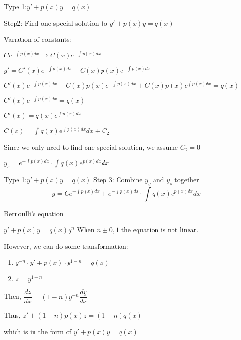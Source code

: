 \begin{frame}{Type 1:$y' + p(x) y = q(x)$}

    Step2: Find one special solution to $y' + p(x) y = q(x)$

    \centering
    Variation of constants:

    $Ce^{-\int p(x)dx} \rightarrow C(x)e^{-\int p(x)dx}$

    $y' = C'(x)e^{-\int p(x)dx} - C(x)p(x) e^{-\int p(x)dx}$

    $C'(x)e^{-\int p(x)dx} - C(x)p(x) e^{-\int p(x)dx} + C(x)p(x)e^{\int p(x)dx} = q(x)$

    $C'(x)e^{-\int p(x)dx} = q(x)$

    $C'(x) = q(x)e^{\int p(x)dx}$

    $C(x) = \int q(x)e^{\int p(x)dx} dx + C_2$

    Since we only need to find one special solution, we assume $C_2 = 0$

    $y_s = e^{-\int p(x)dx}\cdot \int q(x)e^{p(x)dx} dx$
\end{frame}







\begin{frame}{Type 1:$y' + p(x) y = q(x)$}
    Step 3: Combine $y_g$ and $y_s$ together
    \begin{equation*}
        y = Ce^{-\int p(x)dx} + e^{-\int p(x)dx}\cdot \int q(x)e^{p(x)dx} dx
    \end{equation*}
\end{frame}





\begin{frame}{Bernoulli's equation}
    \begin{block}{$y' + p(x)y = q(x) y^n$}
        When $n\pm 0, 1$ the equation is not linear.

        However, we can do some transformation:
        \begin{enumerate}
            \item $y^{-n}\cdot y' + p(x) \cdot y^{1-n} = q(x)$
            \item $z = y^{1-n}$
        \end{enumerate}
        Then, $\dfrac{dz}{dx} = (1-n)y^{-n}\dfrac{dy}{dx}$

        Thus, $z' + (1-n)p(x) z = (1-n)q(x)$

        which is in the form of $y' + p(x)y = q(x)$
    \end{block}

\end{frame}

